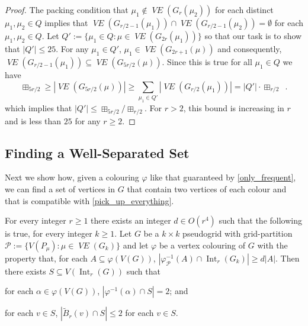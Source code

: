 \documentclass{patmorin}
\newcommand{\vol}[1]{\boxplus_{#1}}
\DeclareMathOperator{\interior}{Int}
\DeclareMathOperator{\VE}{\mathit{VE}}
\begin{document}
\begin{proof}
  The packing condition that $\mu_1\not\in \VE(G_r(\mu_2))$ for each distinct $\mu_1,\mu_2\in Q$ implies that $\VE(G_{r/2-1}(\mu_1))\cap \VE(G_{r/2-1}(\mu_2))=\emptyset$ for each $\mu_1,\mu_2\in Q$.  Let $Q':=\{\mu_1\in Q: \mu\in \VE(G_{2r}(\mu_1))\}$ so that our task is to show that $|Q'|\le 25$.  For any $\mu_1\in Q'$,
  $\mu_1\in\VE(G_{2r+1}(\mu))$ and consequently, $\VE(G_{r/2-1}(\mu_1))\subseteq \VE(G_{5r/2}(\mu))$.
  Since this is true for all $\mu_1\in Q$ we have
  \[  \vol{5r/2} \ge |\VE(G_{5r/2}(\mu))| \ge \sum_{\mu_1\in Q'} |\VE(G_{r/2}(\mu_1))|
  = |Q'|\cdot \vol{r/2} \enspace .
  \]
  which implies that $|Q'|\le \vol{5r/2}/\vol{r/2}$.  For $r > 2$, this bound is increasing in $r$ and is less than $25$ for any $r\ge 2$.
\end{proof}


\subsection{Finding a Well-Separated Set}
\label{well_separated}

Next we show how, given a colouring $\varphi$ like that guaranteed by \cref{only_frequent}, we can find a set of vertices in $G$ that contain two vertices of each colour and that is compatible with \cref{pick_up_everything}.

\begin{lem}\label{doubled_colour_set}
  For every integer $r\ge 1$ there exists an integer $d\in O(r^4)$ such that the following is true, for every integer $k\ge 1$.\newline
  Let $G$ be a $k\times k$ pseudogrid with grid-partition $\mathcal{P}:=\{V(P_\mu):\mu\in\VE(G_k)\}$ and let $\varphi$ be a vertex colouring of $G$ with the property that, for each $A\subseteq\varphi(V(G))$, $|\varphi_{\mathcal{P}}^{-1}(A)\cap\interior_r(G_k)|\ge d|A|$.
  Then there exists $S\subseteq V(\interior_r(G))$ such that
  \begin{compactenum}[(i)]
    \item \label{hits_both} for each $\alpha\in\varphi(V(G))$, $|\varphi^{-1}(\alpha)\cap S|= 2$; and
    \item \label{spread_out} for each $v\in S$, $|\tilde{B}_r(v)\cap S|\le 2$ for each $v\in S$.
  \end{compactenum}
\end{lem}
\end{document}
